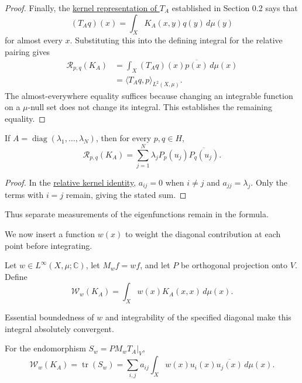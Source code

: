 \begin{proof}
Finally, the \hyperref[finite-kernel-operator]{kernel representation of $T_A$} established in Section 0.2 says that
\[
(T_Aq)(x)=\int_XK_A(x,y)q(y)\,d\mu(y)
\]
for almost every $x$. Substituting this into the defining integral for the relative pairing gives
\[
\begin{aligned}
\mathcal R_{p,q}(K_A)
&=\int_X(T_Aq)(x)\overline{p(x)}\,d\mu(x)\\
&=\langle T_Aq,p\rangle_{L^2(X,\mu)}.
\end{aligned}
\]
The almost-everywhere equality suffices because changing an integrable function on a $\mu$-null set does not change its integral. This establishes the remaining equality.
\end{proof}


\begin{corollary}\label{finite-relative-diagonal-identity}
If $A=\operatorname{diag}(\lambda_1,\ldots,\lambda_N)$, then for every $p,q\in H$,
\[
\mathcal R_{p,q}(K_A)
=\sum_{j=1}^N\lambda_jP_p(u_j)\overline{P_q(u_j)}.
\]
\end{corollary}

\begin{proof}
In the \hyperref[finite-relative-kernel-identity]{relative kernel identity}, $a_{ij}=0$ when $i\ne j$ and $a_{jj}=\lambda_j$. Only the terms with $i=j$ remain, giving the stated sum.
\end{proof}

Thus separate measurements of the eigenfunctions remain in the formula.


We now insert a function $w(x)$ to weight the diagonal contribution at each point before integrating.

\begin{definition}\label{weighted-finite-trace}

Let $w\in L^\infty(X,\mu;\mathbb C)$, let $M_wf=wf$, and let $P$ be orthogonal projection onto $V$. Define
\[
\mathcal W_w(K_A)=\int_Xw(x)K_A(x,x)\,d\mu(x).
\]
\end{definition}

Essential boundedness of $w$ and integrability of the specified diagonal make this integral absolutely convergent.

\begin{proposition}\label{finite-weighted-kernel-identity}
For the endomorphism $S_w=P M_wT_A|_V$,
\[
\mathcal W_w(K_A)=\operatorname{tr}(S_w)
=\sum_{i,j}a_{ij}\int_Xw(x)u_i(x)\overline{u_j(x)}\,d\mu(x).
\]
\end{proposition}

